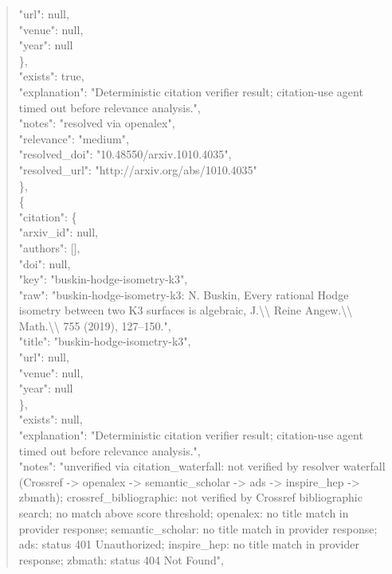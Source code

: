 \documentclass[11pt]{article}
\begin{document}
\begin{quote}
        "url": null,\\
        "venue": null,\\
        "year": null\\
      \},\\
      "exists": true,\\
      "explanation": "Deterministic citation verifier result; citation-use agent timed out before relevance analysis.",\\
      "notes": "resolved via openalex",\\
      "relevance": "medium",\\
      "resolved\_doi": "10.48550/arxiv.1010.4035",\\
      "resolved\_url": "http://arxiv.org/abs/1010.4035"\\
    \},\\
    \{\\
      "citation": \{\\
        "arxiv\_id": null,\\
        "authors": [],\\
        "doi": null,\\
        "key": "buskin-hodge-isometry-k3",\\
        "raw": "buskin-hodge-isometry-k3: N. Buskin, Every rational Hodge isometry between two K3 surfaces is algebraic, J.\textbackslash{}\textbackslash{} Reine Angew.\textbackslash{}\textbackslash{} Math.\textbackslash{}\textbackslash{} 755 (2019), 127--150.",\\
        "title": "buskin-hodge-isometry-k3",\\
        "url": null,\\
        "venue": null,\\
        "year": null\\
      \},\\
      "exists": null,\\
      "explanation": "Deterministic citation verifier result; citation-use agent timed out before relevance analysis.",\\
      "notes": "unverified via citation\_waterfall: not verified by resolver waterfall (Crossref -> openalex -> semantic\_scholar -> ads -> inspire\_hep -> zbmath); crossref\_bibliographic: not verified by Crossref bibliographic search; no match above score threshold; openalex: no title match in provider response; semantic\_scholar: no title match in provider response; ads: status 401 Unauthorized; inspire\_hep: no title match in provider response; zbmath: status 404 Not Found",\\

\end{quote}
\end{document}
